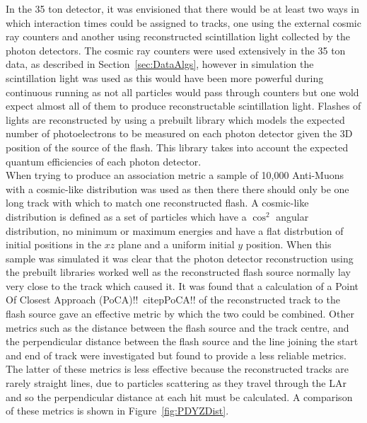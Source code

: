 In the 35 ton detector, it was envisioned that there would be at least two ways in which interaction times could be assigned to tracks, one using the external cosmic ray counters and another using reconstructed scintillation light collected by the photon detectors. The cosmic ray counters were used extensively in the 35 ton data, as described in Section~\ref{sec:DataAlgs}, however in simulation the scintillation light was used as this would have been more powerful during continuous running as not all particles would pass through counters but one wold expect almost all of them to produce reconstructable scintillation light. Flashes of lights are reconstructed by using a prebuilt library which models the expected number of photoelectrons to be measured on each photon detector given the 3D position of the source of the flash. This library takes into account the expected quantum efficiencies of each photon detector. \\

When trying to produce an association metric a sample of 10,000 Anti-Muons with a cosmic-like distribution was used as then there there should only be one long track with which to match one reconstructed flash. A cosmic-like distribution is defined as a set of particles which have a $\cos^{2}$ angular distribution, no minimum or maximum energies and have a flat distrbution of initial positions in the $xz$ plane and a uniform initial $y$ position. When this sample was simulated it was clear that the photon detector reconstruction using the prebuilt libraries worked well as the reconstructed flash source normally lay very close to the track which caused it. It was found that a calculation of a Point Of Closest Approach (PoCA)!!~citep{PoCA}!! of the reconstructed track to the flash source gave an effective metric by which the two could be combined. Other metrics such as the distance between the flash source and the track centre, and the perpendicular distance between the flash source and the line joining the start and end of track were investigated but found to provide a less reliable metrics. The latter of these metrics is less effective because the reconstructed tracks are rarely straight lines, due to particles scattering as they travel through the LAr and so the perpendicular distance at each hit must be calculated. A comparison of these metrics is shown in Figure~\ref{fig:PDYZDist}. \\

